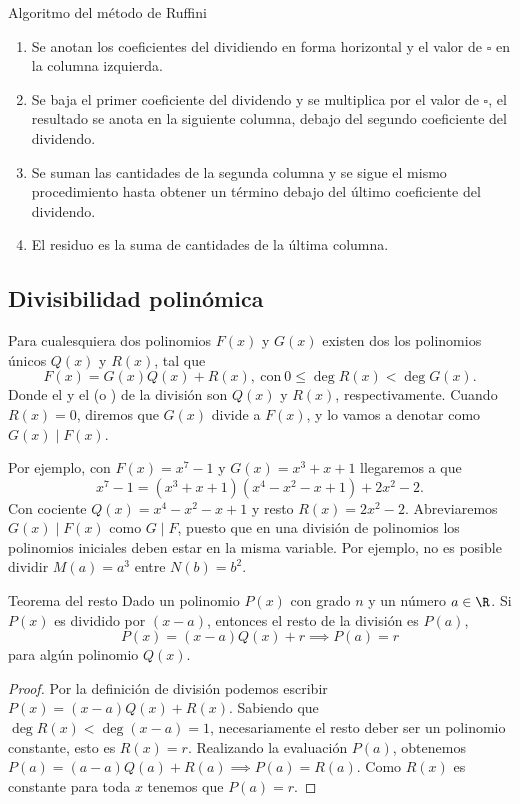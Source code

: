 Algoritmo del método de Ruffini
\begin{enumerate}
    \item Se anotan los coeficientes del dividiendo en forma horizontal y el valor de $\square$ en la columna izquierda.
    \item Se baja el primer coeficiente del dividendo y se multiplica por el valor de $\square$, el resultado se anota en la siguiente columna,
    debajo del segundo coeficiente del dividendo.
    \item Se suman las cantidades de la segunda columna y se sigue el mismo procedimiento hasta obtener un término debajo del último coeficiente del dividendo.
    \item El residuo es la suma de cantidades de la última columna.
\end{enumerate}



\subsection{Divisibilidad polinómica}

\begin{definition}
    Para cualesquiera dos polinomios $F(x)$ y $G(x)$ existen dos los polinomios únicos $Q(x)$ y $R(x)$, tal que
    \[
        F(x) = G(x)Q(x) + R(x),\ \text{con}\ 0 \leq \deg{R(x)} < \deg{G(x)}.
    \]
    Donde el  y el  (o ) de la división son $Q(x)$ y $R(x)$, respectivamente.
    Cuando $R(x) = 0$, diremos que $G(x)$ divide a $F(x)$, y lo vamos a denotar como $G(x) \mid F(x)$.
\end{definition}
Por ejemplo, con $F(x) = x^7 - 1$ y $G(x) = x^3 + x + 1$ llegaremos a que
\[
    x^7 - 1 = (x^3 + x + 1)(x^4 - x^2 - x + 1) + 2 x^2 - 2.
\]
Con cociente $Q(x) = x^4 - x^2 - x + 1$ y resto $R(x) = 2 x^2 - 2$.
Abreviaremos $G(x) \mid F(x)$ como $G \mid F$, puesto que en una división de polinomios los polinomios iniciales deben estar en la misma variable.
Por ejemplo, no es posible dividir $M(a) = a^3$ entre $N(b) = b^2$.


\begin{theorem.tcb}{Teorema del resto}{}
    Dado un polinomio $P(x)$ con grado $n$ y un número $a \in \R$.
    Si $P(x)$ es dividido por $(x - a)$, entonces el resto de la división es $P(a)$, \ie
    \[
        P(x) = (x - a)Q(x) + r \implies P(a) = r
    \]
    para algún polinomio $Q(x)$.
\end{theorem.tcb}
\begin{proof}
    Por la definición de división podemos escribir $P(x) = (x - a)Q(x) + R(x)$.
    Sabiendo que $\deg R(x) < \deg(x - a) = 1$, necesariamente el resto deber ser un polinomio constante, esto es $R(x) = r$.
    Realizando la evaluación $P(a)$, obtenemos $P(a) = (a - a)Q(a) + R(a) \implies P(a) = R(a)$.
    Como $R(x)$ es constante para toda $x$ tenemos que $P(a) = r$.
\end{proof}

